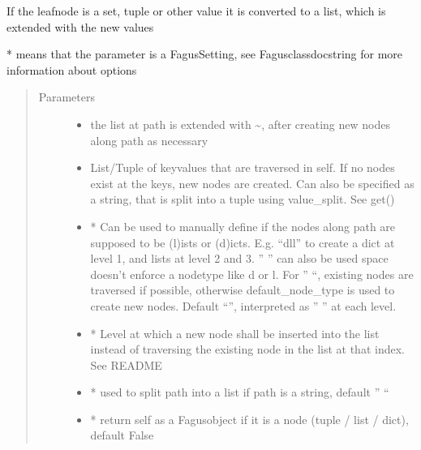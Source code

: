 \documentclass[a4paper,10pt,english]{sphinxmanual}
\begin{document}
\begin{fulllineitems}
\begin{fulllineitems}
\sphinxAtStartPar
If the leaf\sphinxhyphen{}node is a set, tuple or other value it is converted to a list, which is extended with the new values

\sphinxAtStartPar
* means that the parameter is a Fagus\sphinxhyphen{}Setting, see Fagus\sphinxhyphen{}class\sphinxhyphen{}docstring for more information about options
\begin{quote}\begin{description}
\item[{Parameters}] \leavevmode\begin{itemize}
\item {}
\sphinxAtStartPar
{} \textendash{} the list at path is extended with \textasciitilde{}, after creating new nodes along path as necessary

\item {}
\sphinxAtStartPar
{} \textendash{} List/Tuple of key\sphinxhyphen{}values that are traversed in self. If no nodes exist at the keys, new nodes are
created. Can also be specified as a string, that is split into a tuple using value\_split. See get()

\item {}
\sphinxAtStartPar
{} \textendash{} * Can be used to manually define if the nodes along path are supposed to be (l)ists or
(d)icts. E.g. “dll” to create a dict at level 1, and lists at level 2 and 3. ” ” can also be used \sphinxhyphen{}
space doesn’t enforce a node\sphinxhyphen{}type like d or l. For ” “, existing nodes are traversed if possible,
otherwise default\_node\_type is used to create new nodes. Default “”, interpreted as ” ” at each level.

\item {}
\sphinxAtStartPar
{} \textendash{} * Level at which a new node shall be inserted into the list instead of traversing the
existing node in the list at that index. See README

\item {}
\sphinxAtStartPar
{} \textendash{} * used to split path into a list if path is a string, default ” “

\item {}
\sphinxAtStartPar
{} \textendash{} * return self as a Fagus\sphinxhyphen{}object if it is a node (tuple / list / dict), default False


\end{itemize}
\end{description}
\end{quote}
\end{fulllineitems}
\end{fulllineitems}
\end{document}

